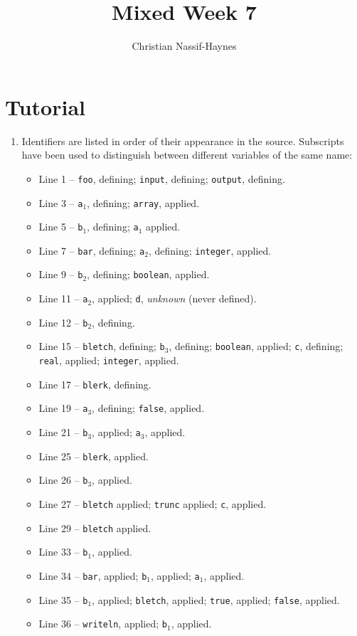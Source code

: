 \documentclass[a4paper]{article}
\begin{document}
	\title{Mixed Week 7}
	\author{Christian Nassif-Haynes}
	\maketitle
	
	\section*{Tutorial}
	\begin{enumerate}
		\item Identifiers are listed in order of their appearance in the source. Subscripts have been used to distinguish between different variables of the same name:
		\begin{itemize}
			\item Line 1 -- \verb=foo=, defining; \verb=input=, defining; \verb=output=, defining.
			\item Line 3 -- \verb=a=$_1$, defining; \verb=array=, applied.
			\item Line 5 -- \verb=b=$_1$, defining; \verb=a=$_1$ applied.
			\item Line 7 -- \verb=bar=, defining; \verb=a=$_2$, defining; \verb=integer=, applied.
			\item Line 9 -- \verb=b=$_2$, defining; \verb=boolean=, applied.
			\item Line 11 -- \verb=a=$_2$, applied; \verb=d=, \textit{unknown} (never defined).
			\item Line 12 -- \verb=b=$_2$, defining.
			\item Line 15 -- \verb=bletch=, defining; \verb=b=$_3$, defining; \verb=boolean=, applied; \verb=c=, defining; \verb=real=, applied; \verb=integer=, applied.
			\item Line 17 -- \verb=blerk=, defining.
			\item Line 19 -- \verb=a=$_3$, defining; \verb=false=, applied.
			\item Line 21 -- \verb=b=$_3$, applied; \verb=a=$_3$, applied.
			\item Line 25 -- \verb=blerk=, applied.
			\item Line 26 -- \verb=b=$_3$, applied.
			\item Line 27 -- \verb=bletch= applied; \verb=trunc= applied; \verb=c=, applied.
			\item Line 29 -- \verb=bletch= applied.
			\item Line 33 -- \verb=b=$_1$, applied.
			\item Line 34 -- \verb=bar=, applied; \verb=b=$_1$, applied; \verb=a=$_1$, applied.
			\item Line 35 -- \verb=b=$_1$, applied; \verb=bletch=, applied; \verb=true=, applied; \verb=false=, applied.
			\item Line 36 -- \verb=writeln=, applied; \verb=b=$_1$, applied.
		\end{itemize}
		

\end{enumerate}
\end{document}
